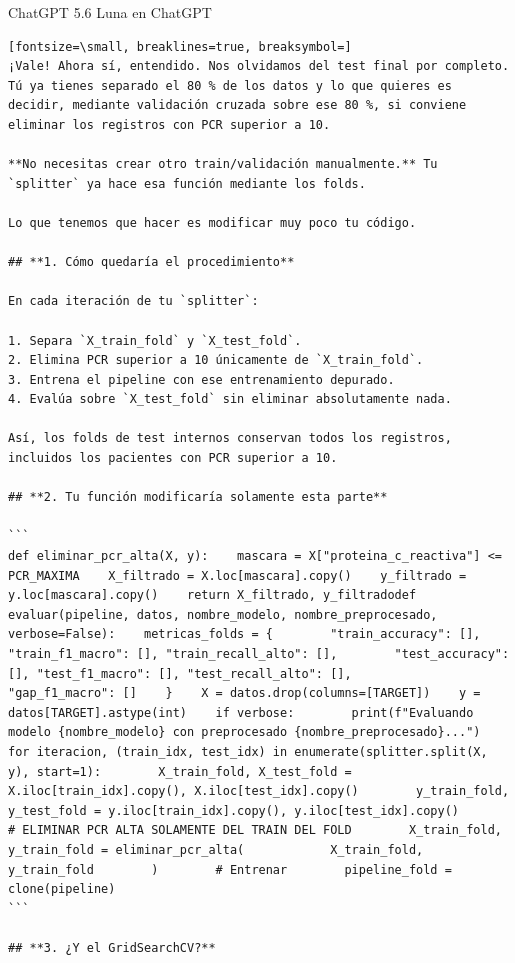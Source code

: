 \documentclass[12pt,a4paper,oneside]{book}
\begin{document}
\begin{iaresp}{ChatGPT 5.6 Luna en ChatGPT}
\begin{Verbatim}[fontsize=\small, breaklines=true, breaksymbol=]
¡Vale! Ahora sí, entendido. Nos olvidamos del test final por completo. Tú ya tienes separado el 80 % de los datos y lo que quieres es decidir, mediante validación cruzada sobre ese 80 %, si conviene eliminar los registros con PCR superior a 10.

**No necesitas crear otro train/validación manualmente.** Tu `splitter` ya hace esa función mediante los folds.

Lo que tenemos que hacer es modificar muy poco tu código.

## **1. Cómo quedaría el procedimiento**

En cada iteración de tu `splitter`:

1. Separa `X_train_fold` y `X_test_fold`.
2. Elimina PCR superior a 10 únicamente de `X_train_fold`.
3. Entrena el pipeline con ese entrenamiento depurado.
4. Evalúa sobre `X_test_fold` sin eliminar absolutamente nada.

Así, los folds de test internos conservan todos los registros, incluidos los pacientes con PCR superior a 10.

## **2. Tu función modificaría solamente esta parte**

```
def eliminar_pcr_alta(X, y):    mascara = X["proteina_c_reactiva"] <= PCR_MAXIMA    X_filtrado = X.loc[mascara].copy()    y_filtrado = y.loc[mascara].copy()    return X_filtrado, y_filtradodef evaluar(pipeline, datos, nombre_modelo, nombre_preprocesado, verbose=False):    metricas_folds = {        "train_accuracy": [], "train_f1_macro": [], "train_recall_alto": [],        "test_accuracy": [], "test_f1_macro": [], "test_recall_alto": [],        "gap_f1_macro": []    }    X = datos.drop(columns=[TARGET])    y = datos[TARGET].astype(int)    if verbose:        print(f"Evaluando modelo {nombre_modelo} con preprocesado {nombre_preprocesado}...")    for iteracion, (train_idx, test_idx) in enumerate(splitter.split(X, y), start=1):        X_train_fold, X_test_fold = X.iloc[train_idx].copy(), X.iloc[test_idx].copy()        y_train_fold, y_test_fold = y.iloc[train_idx].copy(), y.iloc[test_idx].copy()        # ELIMINAR PCR ALTA SOLAMENTE DEL TRAIN DEL FOLD        X_train_fold, y_train_fold = eliminar_pcr_alta(            X_train_fold, y_train_fold        )        # Entrenar        pipeline_fold = clone(pipeline)
```

## **3. ¿Y el GridSearchCV?**


\end{Verbatim}
\end{iaresp}
\end{document}
